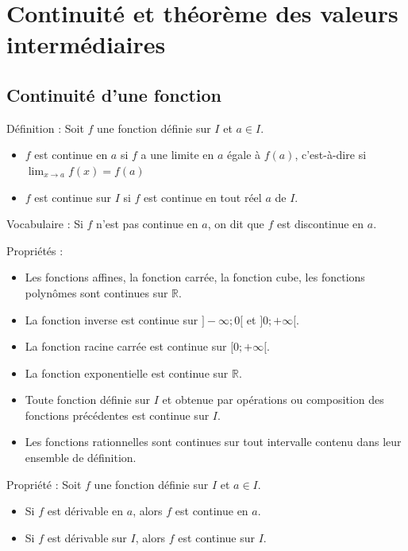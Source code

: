 \documentclass[11pt,a4paper]{article}
\begin{document}
\section{Continuité et théorème des valeurs intermédiaires}

\subsection{Continuité d'une fonction}

\begin{boiteDef}{Définition :}
    Soit $f$ une fonction définie sur $I$ et $a \in I$.
    \newline
    \begin{itemize}
        \item $f$ est continue en $a$ si $f$ a une limite en $a$ égale à $f(a)$, c'est-à-dire si $\lim_{x \to a} f(x) = f(a)$
        \item $f$ est continue sur $I$ si $f$ est continue en tout réel $a$ de $I$.
    \end{itemize}
\end{boiteDef}

\begin{boiteRemarque}{Vocabulaire :}
    Si $f$ n'est pas continue en $a$, on dit que $f$ est discontinue en $a$.
\end{boiteRemarque}

\begin{boiteProp}{Propriétés :}
    \begin{itemize}
        \item Les fonctions affines, la fonction carrée, la fonction cube, les fonctions polynômes sont continues sur $\mathbb{R}$.
        \item La fonction inverse est continue sur $]-\infty;0[$ et $]0;+\infty[$.
        \item La fonction racine carrée est continue sur $[0;+\infty[$.
        \item La fonction exponentielle est continue sur $\mathbb{R}$.
        \item Toute fonction définie sur $I$ et obtenue par opérations ou composition des fonctions précédentes est continue sur $I$.
        \item Les fonctions rationnelles sont continues sur tout intervalle contenu dans leur ensemble de définition.
    \end{itemize}
\end{boiteProp}

\begin{boiteProp}{Propriété :}
    Soit $f$ une fonction définie sur $I$ et $a \in I$.
    \begin{itemize}
        \item Si $f$ est dérivable en $a$, alors $f$ est continue en $a$.
        \item Si $f$ est dérivable sur $I$, alors $f$ est continue sur $I$.
    \end{itemize}
\end{boiteProp}
\end{document}
